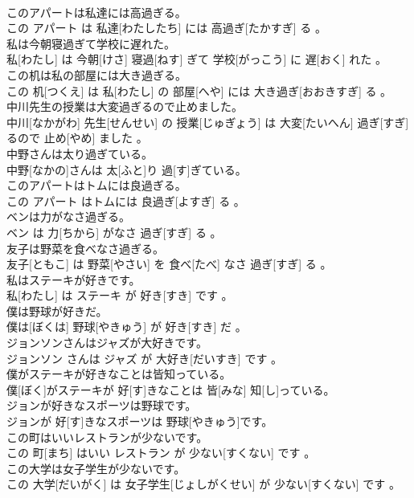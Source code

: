 \documentclass[8pt]{extreport}
\begin{document}
\begin{CJK}{UTF8}{min}
\\	このアパートは私達には高過ぎる。	
\\	この アパート は 私達[わたしたち] には 高過ぎ[たかすぎ] る 。
\\	私は今朝寝過ぎて学校に遅れた。	
\\	私[わたし] は 今朝[けさ] 寝過[ねす] ぎて 学校[がっこう] に 遅[おく] れた 。
\\	この机は私の部屋には大き過ぎる。	
\\	この 机[つくえ] は 私[わたし] の 部屋[へや] には 大き過ぎ[おおきすぎ] る 。
\\	中川先生の授業は大変過ぎるので止めました。	
\\	中川[なかがわ] 先生[せんせい] の 授業[じゅぎょう] は 大変[たいへん] 過ぎ[すぎ] るので 止め[やめ] ました 。
\\	中野さんは太り過ぎている。	
\\	中野[なかの]さんは 太[ふと]り 過[す]ぎている。
\\	このアパートはトムには良過ぎる。	
\\	この アパート はトムには 良過ぎ[よすぎ] る 。
\\	ベンは力がなさ過ぎる。	
\\	ベン は 力[ちから] がなさ 過ぎ[すぎ] る 。
\\	友子は野菜を食べなさ過ぎる。	
\\	友子[ともこ] は 野菜[やさい] を 食べ[たべ] なさ 過ぎ[すぎ] る 。
\\	私はステーキが好きです。	
\\	私[わたし] は ステーキ が 好き[すき] です 。
\\	僕は野球が好きだ。	
\\	僕は[ぼくは] 野球[やきゅう] が 好き[すき] だ 。
\\	ジョンソンさんはジャズが大好きです。	
\\	ジョンソン さんは ジャズ が 大好き[だいすき] です 。
\\	僕がステーキが好きなことは皆知っている。	
\\	僕[ぼく]がステーキが 好[す]きなことは 皆[みな] 知[し]っている。
\\	ジョンが好きなスポーツは野球です。	
\\	ジョンが 好[す]きなスポーツは 野球[やきゅう]です。
\\	この町はいいレストランが少ないです。	
\\	この 町[まち] はいい レストラン が 少ない[すくない] です 。
\\	この大学は女子学生が少ないです。	
\\	この 大学[だいがく] は 女子学生[じょしがくせい] が 少ない[すくない] です 。

\end{CJK}
\end{document}
